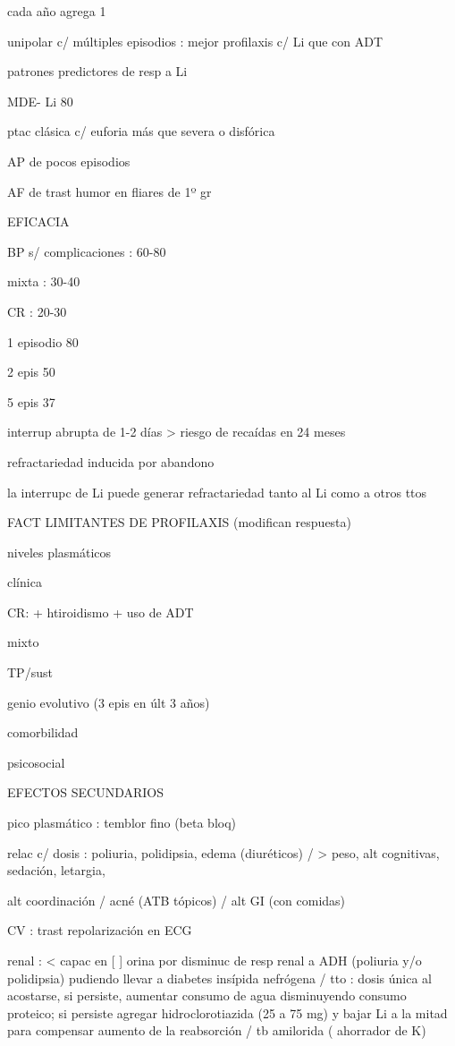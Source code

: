 \documentclass{scrbook}
\begin{document}
cada año agrega 1%

unipolar c/ múltiples episodios : mejor profilaxis c/ Li que con ADT

patrones predictores de resp a Li

MDE- Li 80%

ptac clásica c/ euforia más que severa o disfórica

AP de pocos episodios

AF de trast humor en fliares de 1º gr

EFICACIA

BP s/ complicaciones : 60-80%

mixta : 30-40%

CR : 20-30%

1 episodio 80%

2 epis 50%

5 epis 37%

interrup abrupta de 1-2 días > riesgo de recaídas en 24 meses

refractariedad inducida por abandono

la interrupc de Li puede generar refractariedad tanto al Li como a otros ttos

FACT LIMITANTES DE PROFILAXIS (modifican respuesta)

niveles plasmáticos

clínica

CR: + htiroidismo + uso de ADT

mixto

TP/sust

genio evolutivo (3 epis en últ 3 años)

comorbilidad

psicosocial

EFECTOS SECUNDARIOS

pico plasmático : temblor fino (beta bloq)

relac c/ dosis : poliuria, polidipsia, edema (diuréticos) / > peso, alt cognitivas, sedación, letargia,

alt coordinación / acné (ATB tópicos) / alt GI (con comidas)

CV : trast repolarización en ECG

renal : < capac en [ ] orina por disminuc de resp renal a ADH (poliuria y/o polidipsia) pudiendo llevar a diabetes insípida nefrógena / tto : dosis única al acostarse, si persiste, aumentar consumo de agua disminuyendo consumo proteico; si persiste agregar hidroclorotiazida (25 a 75 mg) y bajar Li a la mitad para compensar aumento de la reabsorción / tb amilorida ( ahorrador de K)
\end{document}
